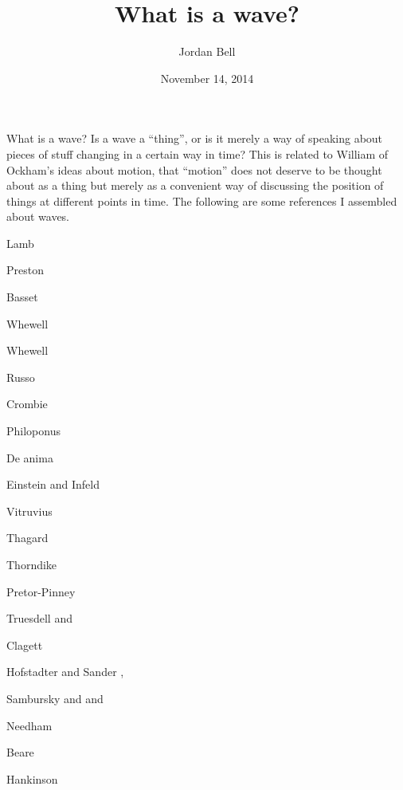 \documentclass{article}
\theoremstyle{definition}
\begin{document}
\title{What is a wave?}
\author{Jordan Bell}
\date{November 14, 2014}

\maketitle

What is a wave? Is a wave a ``thing'', or is it merely a way of speaking about pieces of stuff changing in a certain way in time? This is related to William of Ockham's ideas
about motion, that ``motion'' does not deserve to be thought about as a thing but merely as a convenient way of discussing the position of things at different points in time. The following
are some references I assembled about waves.

Lamb \cite[p.~369, \S 236]{lamb}

Preston \cite[p.~412, \S 289]{preston}

Basset \cite[p.~163, \S 405]{basset} 

Whewell \cite[Book IV]{whewellI}

Whewell \cite[Book VIII]{whewellII}

Russo \cite[p.~229]{russo}

Crombie \cite[p.~126]{crombie}

Philoponus \cite[p.~149]{philoponus}

De anima \cite[\S 447]{deanima}

Einstein and Infeld \cite[p.~100]{einstein}

Vitruvius \cite[p.~11]{mental}

Thagard \cite[p.~39]{thagard1993}

Thorndike \cite[p.~32]{thorndikeII}

Pretor-Pinney \cite[pp.~35, 81, 161, 269]{pretor-pinney}

Truesdell \cite[p.~71]{truesdell} and \cite[pp.~CXXI--CXXIII]{II12}

Clagett \cite[p.~74]{clagett}

Hofstadter and Sander \cite[p.~209]{hofstadter},

Sambursky \cite[pp.~138--141]{sambursky1960} and \cite[pp.~89, 100--104]{sambursky1962} and \cite[p.~22--29]{sambursky1959}

Needham \cite[pp.~8-10]{needhamIV1}

Beare \cite[pp.~93--95]{beare}

Hankinson \cite[p.~240]{hankinson}

\nocite{*}



\end{document}
